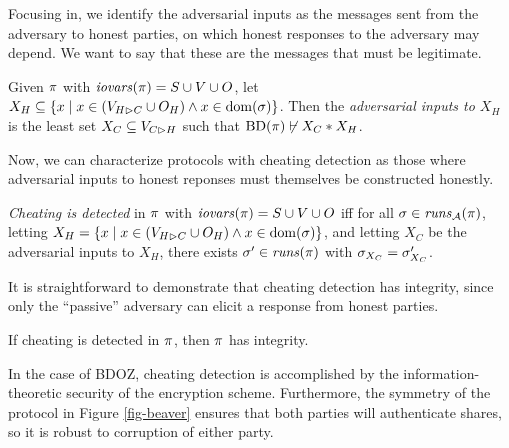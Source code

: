 Focusing in, we identify the adversarial inputs as the messages
sent from the adversary to honest parties, on which honest responses
to the adversary may depend. We want to say that these are the messages
that must be legitimate.
\begin{definition}
  Given $\pi$ with $\mathit{iovars}(\pi) = S \cup V \cup O$,
  let $X_H \subseteq \{ x \mid x \in (V_{H \rhd C} \cup O_H) \wedge x \in \mathrm{dom}(\sigma) \}$.
  Then the \emph{adversarial inputs to $X_H$} is the least set
  $X_C \subseteq V_{C \rhd H}$ such that $\mathrm{BD}(\pi) \not\vdash X_C * X_H$.
\end{definition}
Now, we can characterize protocols with cheating detection as those where
adversarial inputs to honest reponses must themselves be constructed honestly. 
\begin{definition}
  \emph{Cheating is detected} in $\pi$ with $\mathit{iovars}(\pi) = S \cup V \cup O$ iff
  for all  $\sigma \in \mathit{runs}_{\mathcal{A}}(\pi)$,
  letting $X_H = \{ x \mid x \in (V_{H \rhd C} \cup O_H) \wedge x \in \mathrm{dom}(\sigma) \}$,
  and letting $X_C$ be the adversarial inputs to $X_H$,
  there exists $\sigma'\in \mathit{runs}(\pi)$
  with $\sigma_{X_C} = \sigma'_{X_C}$.  
\end{definition}

It is straightforward to demonstrate that cheating detection has integrity,
since only the ``passive'' adversary can elicit a response from honest parties. 
\begin{lemma}
  \label{lemma-cheating}
  If cheating is detected in $\pi$, then $\pi$ has integrity.
\end{lemma}

In the case of BDOZ, cheating detection is accomplished by the information-theoretic
security of the encryption scheme\cite{XXX}. Furthermore, the symmetry of
the protocol in Figure \ref{fig-beaver} ensures that both parties will authenticate
shares, so it is robust to corruption of either party. 
